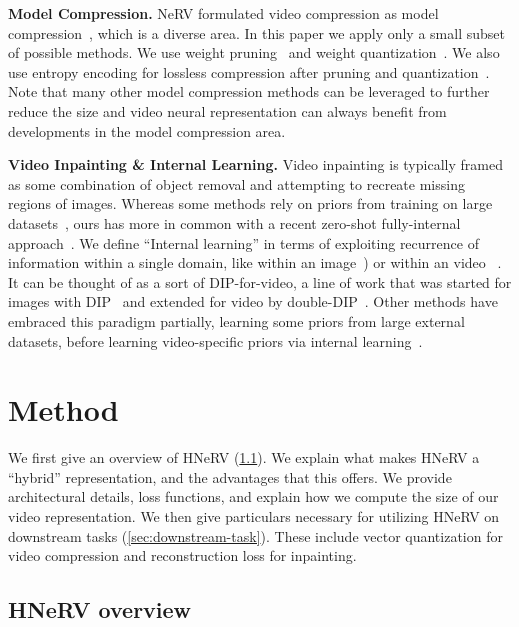 \documentclass[10pt,twocolumn,letterpaper]{article}
\begin{document}
\noindent\textbf{Model Compression.}
NeRV formulated video compression as model compression~\cite{chen2021nerv}, which is a diverse area.
In this paper we apply only a small subset of possible methods.
We use weight pruning~\cite{DBLP:journals/corr/HanPTD15} and weight quantization~\cite{DBLP:journals/corr/GuptaAGN15,DBLP:journals/corr/abs-1712-05877,krishnamoorthi2018quantizing}.
We also use entropy encoding for lossless compression after pruning and quantization~\cite{huffman1952method,han2015deep}.
Note that many other model compression methods can be leveraged to further reduce the size and video neural representation can always benefit from developments in the model compression area.

\noindent\textbf{Video Inpainting \& Internal Learning.} 
Video inpainting is typically framed as some combination of object removal and attempting to recreate missing regions of images.
Whereas some methods rely on priors from training on large datasets~\cite{wang2021image}, ours has more in common with a recent zero-shot fully-internal approach~\cite{ouyang2021video}.
We define ``Internal learning'' in terms of exploiting recurrence of information within a single domain, like within an image~\cite{Shocher_2018_CVPR}) or within an video ~\cite{zhang2019internal}.
It can be thought of as a sort of DIP-for-video, a line of work that was started for images with DIP~\cite{ulyanov2018deep} and extended for video by double-DIP~\cite{Gandelsman_2019_CVPR}.
Other methods have embraced this paradigm partially, learning some priors from large external datasets, before learning video-specific priors via internal learning~\cite{wang2021image}.


\section{Method}

We first give an overview of HNeRV (\cref{sec:hnerv-overview}).
We explain what makes HNeRV a ``hybrid'' representation, and the advantages that this offers.
We provide architectural details, loss functions, and explain how we compute the size of our video representation.
We then give particulars necessary for utilizing HNeRV on downstream tasks (\cref{sec:downstream-task}).
These include vector quantization for video compression and reconstruction loss for inpainting.

\subsection{HNeRV overview}
\label{sec:hnerv-overview}
\end{document}
